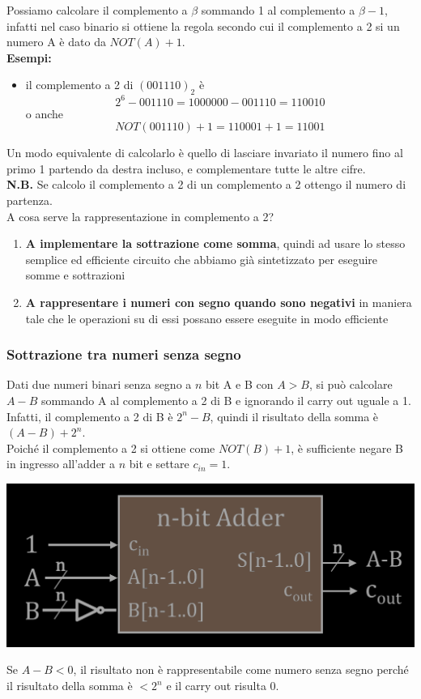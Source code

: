 \documentclass{article}
\begin{document}
Possiamo calcolare il complemento a $\beta$ sommando 1 al complemento a $\beta - 1$, infatti nel caso binario si ottiene la regola secondo cui il {\color{cyan}complemento a 2} si un numero A è dato da $NOT(A)+1$.
\vspace{0.1cm}\\
\textbf{Esempi:}
\begin{itemize}
    \item il complemento a 2 di $(001110)_2$ è 
    $$ 2^6-001110 = 1000000 - 001110= 110010 $$
    o anche
    $$ NOT (001110) + 1 = 110001 + 1 = 11001 $$
\end{itemize}
Un modo equivalente di calcolarlo è quello di lasciare invariato il numero fino al primo 1 partendo da destra incluso, e complementare tutte le altre cifre.\\
\textbf{N.B.} Se calcolo il complemento a 2 di un complemento a 2 ottengo il numero di partenza.
\vspace{0.3cm}\\
A cosa serve la rappresentazione in complemento a 2?
\begin{enumerate}
    \item \textbf{\color{cyan} A implementare la sottrazione come somma}, quindi ad usare lo stesso semplice ed efficiente circuito che abbiamo già sintetizzato per eseguire somme e sottrazioni
    \item \textbf{\color{cyan} A rappresentare i numeri con segno quando sono negativi} in maniera tale che le operazioni su di essi possano essere eseguite in modo efficiente
\end{enumerate}



\subsubsection{Sottrazione tra numeri senza segno}
Dati due numeri binari senza segno a $n$ bit A e B con $A>B$, si può calcolare $A-B$ sommando A al complemento a 2 di B e ignorando il carry out uguale a 1. Infatti, il complemento a 2 di B è $2^n-B$, quindi il risultato della somma è $(A-B)+2^n$.\\
Poiché il complemento a 2 si ottiene come $NOT(B) + 1$, è sufficiente negare B in ingresso all’adder a $n$ bit e settare $c_{in}=1$.
\begin{center}
    \includegraphics[scale=0.38]{sottrazione.png}
\end{center}
Se $A - B < 0$, il risultato non è rappresentabile come numero senza segno perché il risultato della somma è $<2^n$ e il carry out risulta 0.
\end{document}
